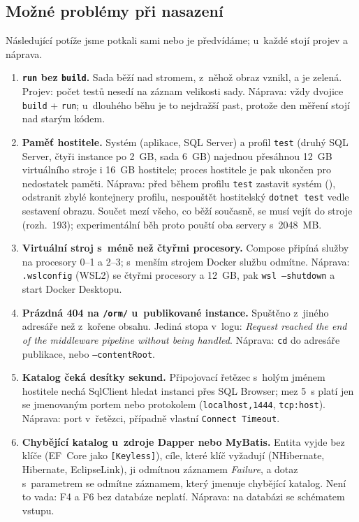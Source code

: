 \documentclass{article}
\begin{document}
\subsection{Možné problémy při nasazení}\label{sec:problemy}

Následující potíže jsme potkali sami nebo je předvídáme; u~každé stojí projev a náprava.

\begin{enumerate}[leftmargin=*,itemsep=2pt]
\item \textbf{\texttt{run} bez \texttt{build}.} Sada běží nad stromem, z~něhož obraz vznikl, a je zelená. Projev: počet testů nesedí na záznam velikosti sady. Náprava: vždy dvojice \texttt{build} + \texttt{run}; u~dlouhého běhu je to nejdražší past, protože den měření stojí nad starým kódem.
\item \textbf{Paměť hostitele.} Systém (aplikace, SQL Server) a profil \texttt{test} (druhý SQL Server, čtyři instance po 2~GB, sada 6~GB) najednou přesáhnou 12~GB virtuálního stroje i 16~GB hostitele; proces hostitele je pak ukončen pro nedostatek paměti. Náprava: před během profilu \texttt{test} zastavit systém (), odstranit zbylé kontejnery profilu, nespouštět hostitelský \texttt{dotnet test} vedle sestavení obrazu. Součet mezí všeho, co běží současně, se musí vejít do stroje (rozh.~193); experimentální běh proto pouští oba servery s~2048~MB.
\item \textbf{Virtuální stroj s~méně než čtyřmi procesory.} Compose připíná služby na procesory 0--1 a 2--3; s~menším strojem Docker službu odmítne. Náprava: \texttt{.wslconfig} (WSL2) se čtyřmi procesory a 12~GB, pak \texttt{wsl --shutdown} a start Docker Desktopu.
\item \textbf{Prázdná 404 na \texttt{/orm/} u~publikované instance.} Spuštěno z~jiného adresáře než z~kořene obsahu. Jediná stopa v~logu: \emph{Request reached the end of the middleware pipeline without being handled}. Náprava: \texttt{cd} do adresáře publikace, nebo \texttt{--contentRoot}.
\item \textbf{Katalog čeká desítky sekund.} Připojovací řetězec s~holým jménem hostitele nechá SqlClient hledat instanci přes SQL Browser; mez 5~s platí jen se jmenovaným portem nebo protokolem (\texttt{localhost,1444}, \texttt{tcp:host}). Náprava: port v~řetězci, případně vlastní \texttt{Connect Timeout}.
\item \textbf{Chybějící katalog u~zdroje Dapper nebo MyBatis.} Entita vyjde bez klíče (EF~Core jako \texttt{[Keyless]}), cíle, které klíč vyžadují (NHibernate, Hibernate, EclipseLink), ji odmítnou záznamem \emph{Failure}, a dotaz s~parametrem se odmítne záznamem, který jmenuje chybějící katalog. Není to vada: F4 a F6 bez databáze neplatí. Náprava:  na databázi se schématem vstupu.

\end{enumerate}
\end{document}
